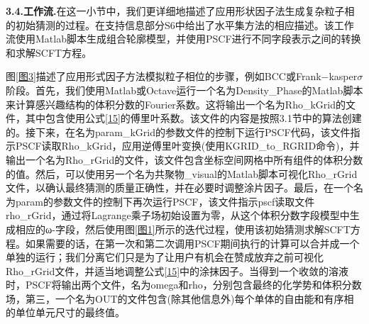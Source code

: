 \documentclass[12pt，a4paper]{article}
\numberwithin{equation}{section}
\begin{document}
\textbf{3.4.工作流.}在这一小节中，我们更详细地描述了应用形状因子法生成复杂粒子相的初始猜测的过程。在支持信息部分S6中给出了水平集方法的相应描述。该工作流使用Matlab脚本生成组合轮廓模型，并使用PSCF进行不同字段表示之间的转换和求解SCFT方程。

图\ref{图3}描述了应用形式因子方法模拟粒子相位的步骤，例如BCC或Frank−kasper$\sigma$阶段。首先，我们使用Matlab或Octave运行一个名为Density\_Phase的Matlab脚本来计算感兴趣结构的体积分数的Fourier系数。这将输出一个名为Rho\_kGrid的文件，其中包含使用公式\ref{15}的傅里叶系数。该文件的内容是按照3.1节中的算法创建的。接下来，在名为param\_kGrid的参数文件的控制下运行PSCF代码，该文件指示PSCF读取Rho\_kGrid，应用逆傅里叶变换(使用KGRID\_to\_RGRID命令)，并输出一个名为Rho\_rGrid的文件，该文件包含坐标空间网格中所有组件的体积分数的值。然后，可以使用另一个名为共聚物\_visual的Matlab脚本可视化Rho\_rGrid文件，以确认最终猜测的质量正确性，并在必要时调整涂片因子。最后，在一个名为param的参数文件的控制下再次运行PSCF，该文件指示pscf读取文件rho\_rGrid，通过将Lagrange乘子场初始设置为零，从这个体积分数字段模型中生成相应的ω-字段，然后使用图\ref{图1}所示的迭代过程，使用该初始猜测求解SCFT方程。如果需要的话，在第一次和第二次调用PSCF期间执行的计算可以合并成一个单独的运行；我们分离它们只是为了让用户有机会在赞成放弃之前可视化Rho\_rGrid文件，并适当地调整公式\ref{15}中的涂抹因子。当得到一个收敛的溶液时，PSCF将输出两个文件，名为omega和rho，分别包含最终的化学势和体积分数场，第三，一个名为OUT的文件包含(除其他信息外)每个单体的自由能和有序相的单位单元尺寸的最终值。
\end{document}
